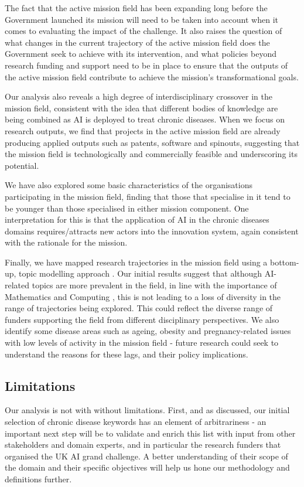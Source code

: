 \documentclass[11pt]{article}
\begin{document}
The fact that the active mission field has been expanding long before the Government launched its mission will need to be taken into account when it comes to evaluating the impact of the challenge. It also raises the question of what changes in the current trajectory of the active mission field does the Government seek to achieve with its intervention, and what policies beyond research funding and support need to be in place to ensure that the outputs of the active mission field contribute to achieve the mission's transformational goals.

Our analysis also reveals a high degree of interdisciplinary crossover in the mission field, consistent with the idea that different bodies of knowledge are being combined as AI is deployed to treat chronic diseases. When we focus on research outputs, we find that projects in the active mission field are already producing applied outputs such as patents, software and spinouts,
suggesting that the mission field is technologically and commercially feasible and underscoring its potential.

We have also explored some basic characteristics of the organisations participating in the mission field, finding that those that specialise in it tend to be younger than those specialised in either mission component. One interpretation for this is that the application of AI in the chronic diseases domains requires/attracts new actors into the innovation system, again consistent with the rationale for the mission.

Finally, we have mapped research trajectories in the mission field using a bottom-up, topic modelling approach . Our initial results suggest that although AI-related topics are more prevalent in the field, in line with the importance of Mathematics and Computing , this is not leading to a loss of diversity in the range of trajectories being explored. This could reflect the diverse range of funders supporting the field from different disciplinary perspectives. We also identify some disease areas such as ageing, obesity and pregnancy-related issues with low levels of activity in the mission field - future research could seek to understand the reasons for these lags, and their policy implications.

\subsection{Limitations}
Our analysis is not with without limitations. First, and as discussed, our initial selection of chronic disease keywords has an element of arbitrariness - an important next step will be to validate and enrich this list with input from other stakeholders and domain experts, and in particular the research funders that organised the UK AI grand challenge. A better understanding of their scope of the domain and their specific objectives will help us hone our methodology and definitions further.
\end{document}
